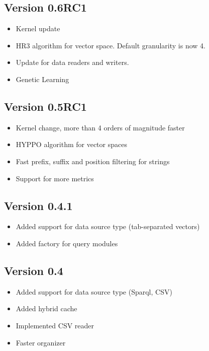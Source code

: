 \documentclass[a4paper, 11pt]{article}
\begin{document}
\subsection{Version 0.6RC1}
\begin{itemize}
\item Kernel update
\item HR3 algorithm for vector space. Default granularity is now 4.
\item Update for data readers and writers.
\item Genetic Learning
\end{itemize}

\subsection{Version 0.5RC1}
\begin{itemize}
\item Kernel change, more than 4 orders of magnitude faster
\item HYPPO algorithm for vector spaces
\item Fast prefix, suffix and position filtering for strings
\item Support for more metrics
\end{itemize}
\subsection{Version 0.4.1}
\begin{itemize}
\item Added support for data source type (tab-separated vectors)
\item Added factory for query modules
\end{itemize}

\subsection{Version 0.4}
\begin{itemize}
\item Added support for data source type (Sparql, CSV)
\item Added hybrid cache
\item Implemented CSV reader
\item Faster organizer 
\end{itemize}
\end{document}

